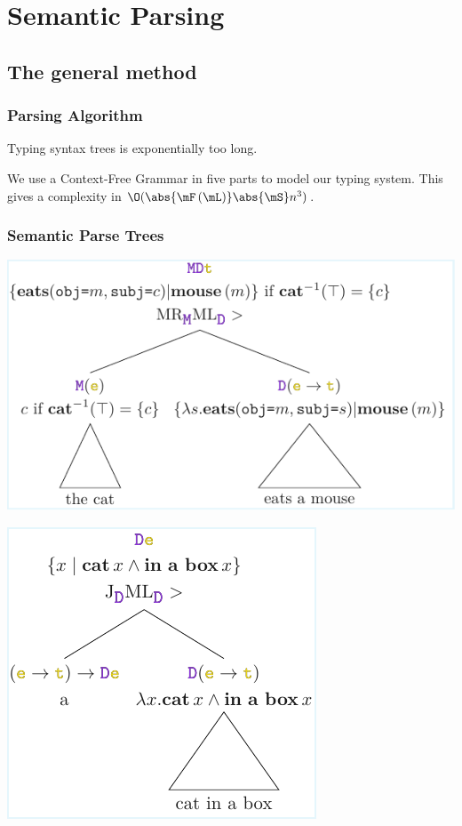 \documentclass[math, english, info]{beamercours}
\begin{document}
\section{Semantic Parsing}
\subsection{The general method}
\begin{frame}
	\frametitle{Parsing Algorithm}
	Typing syntax trees is exponentially too long.

	\pause\medskip

	We use a Context-Free Grammar in five parts to model our typing system.
	This gives a complexity in $\O(\abs{\mF\left(\mL\right)}\abs{\mS}n^{3})$.
\end{frame}

\begin{frame}
	\frametitle{Semantic Parse Trees}
	\begin{center}
		\includegraphics{aux/figures/parse-tree-2.pdf}
	\end{center}

	\centering
	\includegraphics{aux/figures/parse-tree-1.pdf}


\end{frame}
\end{document}
